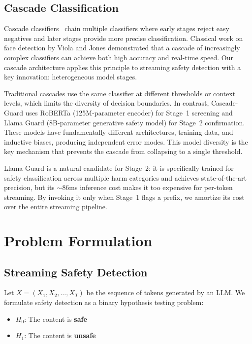 \documentclass[acmtjournal, acmnowidth]{acmart}
\newcommand{\Hzero}{H_0}
\newcommand{\Hone}{H_1}
\theoremstyle{definition}
\begin{document}
\subsection{Cascade Classification}

Cascade classifiers~\cite{viola2001} chain multiple classifiers where early stages reject easy negatives and later stages provide more precise classification. Classical work on face detection by Viola and Jones demonstrated that a cascade of increasingly complex classifiers can achieve both high accuracy and real-time speed. Our cascade architecture applies this principle to streaming safety detection with a key innovation: heterogeneous model stages.

Traditional cascades use the same classifier at different thresholds or context levels, which limits the diversity of decision boundaries. In contrast, Cascade-Guard uses RoBERTa (125M-parameter encoder) for Stage~1 screening and Llama Guard (8B-parameter generative safety model) for Stage~2 confirmation. These models have fundamentally different architectures, training data, and inductive biases, producing independent error modes. This model diversity is the key mechanism that prevents the cascade from collapsing to a single threshold.

Llama Guard is a natural candidate for Stage~2: it is specifically trained for safety classification across multiple harm categories and achieves state-of-the-art precision, but its ${\sim}$86ms inference cost makes it too expensive for per-token streaming. By invoking it only when Stage~1 flags a prefix, we amortize its cost over the entire streaming pipeline.

\section{Problem Formulation}

\subsection{Streaming Safety Detection}

Let $X = (X_1, X_2, \ldots, X_T)$ be the sequence of tokens generated by an LLM. We formulate safety detection as a binary hypothesis testing problem:

\begin{itemize}
    \item $\Hzero$: The content is \textbf{safe}
    \item $\Hone$: The content is \textbf{unsafe}
\end{itemize}
\end{document}

